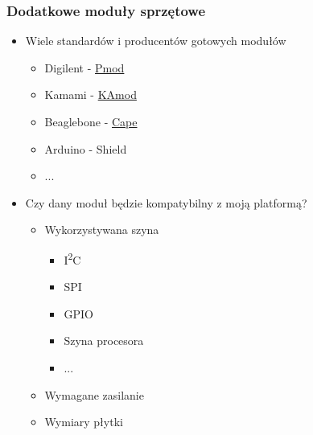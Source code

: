 \documentclass[dvipsnames,table]{beamer}
\begin{document}
\begin{frame}
\frametitle{Dodatkowe moduły sprzętowe}
\begin{itemize}
	\item Wiele standardów i producentów gotowych modułów
		\begin{itemize}
			\item Digilent - \href{http://www.digilentinc.com/Products/Catalog.cfm?NavPath=2,401&Cat=9}{Pmod}
			\item Kamami - \href{http://kamami.pl/index.php?categoryID=3308}{KAmod}
			\item Beaglebone - \href{http://circuitco.com/support/index.php?title=BeagleBone_Capes}{Cape}
			\item Arduino - Shield
			\item ...
		\end{itemize}
	\item Czy dany moduł będzie kompatybilny z moją platformą?
	\begin{itemize}
		\item Wykorzystywana szyna
			\begin{itemize}
				\item I\textsuperscript{2}C
				\item SPI 
				\item GPIO
				\item Szyna procesora
				\item ...
			\end{itemize}
		\item Wymagane zasilanie
		\item Wymiary płytki
	\end{itemize}
\end{itemize}
\end{frame}
\end{document}
